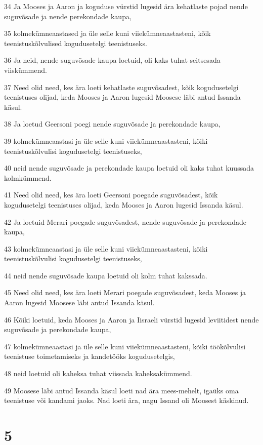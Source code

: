 \par 34 Ja Mooses ja Aaron ja koguduse vürstid lugesid ära kehatlaste pojad nende suguvõsade ja nende perekondade kaupa,
\par 35 kolmekümneaastased ja üle selle kuni viiekümneaastasteni, kõik teenistuskõlvulised kogudusetelgi teenistuseks.
\par 36 Ja neid, nende suguvõsade kaupa loetuid, oli kaks tuhat seitsesada viiskümmend.
\par 37 Need olid need, kes ära loeti kehatlaste suguvõsadest, kõik kogudusetelgi teenistuses olijad, keda Mooses ja Aaron lugesid Moosese läbi antud Issanda käsul.
\par 38 Ja loetud Geersoni poegi nende suguvõsade ja perekondade kaupa,
\par 39 kolmekümneaastasi ja üle selle kuni viiekümneaastasteni, kõiki teenistuskõlvulisi kogudusetelgi teenistuseks,
\par 40 neid nende suguvõsade ja perekondade kaupa loetuid oli kaks tuhat kuussada kolmkümmend.
\par 41 Need olid need, kes ära loeti Geersoni poegade suguvõsadest, kõik kogudusetelgi teenistuses olijad, keda Mooses ja Aaron lugesid Issanda käsul.
\par 42 Ja loetuid Merari poegade suguvõsadest, nende suguvõsade ja perekondade kaupa,
\par 43 kolmekümneaastasi ja üle selle kuni viiekümneaastasteni, kõiki teenistuskõlvulisi kogudusetelgi teenistuseks,
\par 44 neid nende suguvõsade kaupa loetuid oli kolm tuhat kakssada.
\par 45 Need olid need, kes ära loeti Merari poegade suguvõsadest, keda Mooses ja Aaron lugesid Moosese läbi antud Issanda käsul.
\par 46 Kõiki loetuid, keda Mooses ja Aaron ja Iisraeli vürstid lugesid leviitidest nende suguvõsade ja perekondade kaupa,
\par 47 kolmekümneaastasi ja üle selle kuni viiekümneaastasteni, kõiki töökõlvulisi teenistuse toimetamiseks ja kandetööks kogudusetelgis,
\par 48 neid loetuid oli kaheksa tuhat viissada kaheksakümmend.
\par 49 Moosese läbi antud Issanda käsul loeti nad ära mees-mehelt, igaüks oma teenistuse või kandami jaoks. Nad loeti ära, nagu Issand oli Moosest käskinud.

\chapter{5}

